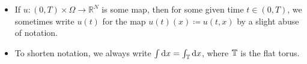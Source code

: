 \begin{itemize}[leftmargin=*]
		\item 
		If $ u \colon ( 0 , T ) \times \Omega \to \mathbb{ R }^{ N } $ is some 
		map, then for some given time $ t \in ( 0 , T ) $, we sometimes write $ 
		u ( t ) $ for the map $ u ( t ) ( x ) \coloneqq u ( t , x ) $ by a 
		slight abuse of notation.
		
		\item
		To shorten notation, we always write $ \int \dd{ x } = \int_{ 
		\operatorname{\mathbb{T}} } \dd{ x } $, where $ \operatorname{\mathbb{T}} $ is the flat torus.
	\end{itemize}
